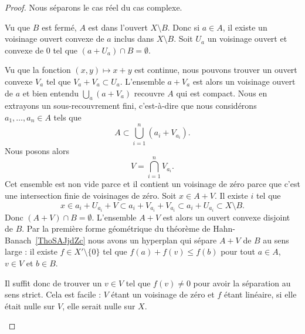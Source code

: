 \begin{proof}
	Nous séparons le cas réel du cas complexe.
	\begin{subproof}

		Vu que \( B\) est fermé, \( A\) est dans l'ouvert \( X\setminus B\). Donc si \( a\in A\), il existe un voisinage ouvert convexe de \( a\) inclus dans \( X\setminus B\). Soit \( U_a\) un voisinage ouvert et convexe de \( 0\) tel que \( (a+U_a)\cap B=\emptyset\).

		Vu que la fonction \( (x,y)\mapsto x+y\) est continue, nous pouvons trouver un ouvert convexe \( V_a\) tel que \( V_a+V_a\subset U_a\). L'ensemble \( a+V_a\) est alors un voisinage ouvert de \( a\) et bien entendu \( \bigcup_a(a+V_a)\) recouvre \( A\) qui est compact. Nous en extrayons un sous-recouvrement fini, c'est-à-dire que nous considérons \( a_1,\ldots, a_n\in A\) tels que
		\begin{equation}
			A\subset \bigcup_{i=1}^n(a_i+V_{a_i}).
		\end{equation}
		Nous posons alors
		\begin{equation}
			V=\bigcap_{i=1}^nV_{a_i}.
		\end{equation}
		Cet ensemble est non vide parce et il contient un voisinage de zéro parce que c'est une intersection finie de voisinages de zéro. Soit \( x\in A+V\). Il existe \( i\) tel que
		\begin{equation}
			x\in a_i+U_{a_i}+V\subset a_i+V_{a_i}+V_{a_i}\subset a_i+U_{a_i}\subset X\setminus B.
		\end{equation}
		Donc \( (A+V)\cap B=\emptyset\). L'ensemble \( A+V\) est alors un ouvert convexe disjoint de \( B\). Par la première forme géométrique du théorème de Hahn-Banach~\ref{ThoSAJjdZc} nous avons un hyperplan qui sépare \( A+V\) de \( B\) au sens large : il existe \( f\in X'\setminus\{ 0 \}\) tel que \( f(a)+f(v)\leq f(b)\) pour tout \( a\in A\), \( v\in V\) et \( b\in B\).

		Il suffit donc de trouver un \( v\in V\) tel que \( f(v)\neq 0\) pour avoir la séparation au sens strict. Cela est facile : \( V\) étant un voisinage de zéro et \( f\) étant linéaire, si elle était nulle sur \( V\), elle serait nulle sur \( X\).



\end{subproof}
\end{proof}
